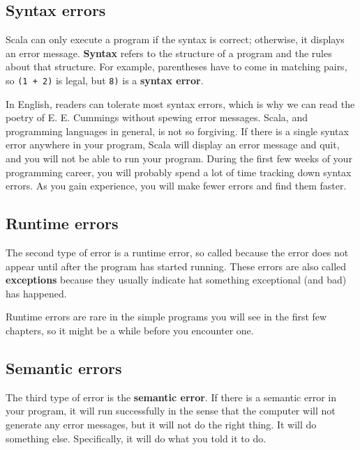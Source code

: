 \documentclass[10pt]{book}
\begin{document}
\subsection{Syntax errors}

Scala can only execute a program if the syntax is correct; otherwise, it displays an error message. {\bf Syntax} refers to the structure of a program and the rules about that structure. For example, parentheses have to come in matching pairs, so {\tt (1 + 2)} is legal, but {\tt 8)} is a {\bf syntax error}.


In English, readers can tolerate most syntax errors, which is why we can read the poetry of E. E.
Cummings without spewing error messages. Scala, and programming languages in general, is not so
forgiving.  If there is a single syntax error anywhere in your program, Scala will display an error
message and quit, and you will not be able to run your program. During the first few weeks of your
programming career, you will probably spend a lot of time tracking down syntax errors.  As you gain
experience, you will make fewer errors and find them faster.

\subsection{Runtime errors}
\label{runtime}

The second type of error is a runtime error, so called because the error does not appear until after the program has started running. These errors are also called {\bf exceptions} because they usually indicate hat something exceptional (and bad) has happened.

Runtime errors are rare in the simple programs you will see in the first few chapters, so it might be a while before you encounter one.

\subsection{Semantic errors}

The third type of error is the {\bf semantic error}.  If there is a semantic error in your program, it will run successfully in the sense that the computer will not generate any error messages, but it will not do the right thing.  It will do something else.  Specifically, it will do what you told it to do.
\end{document}
